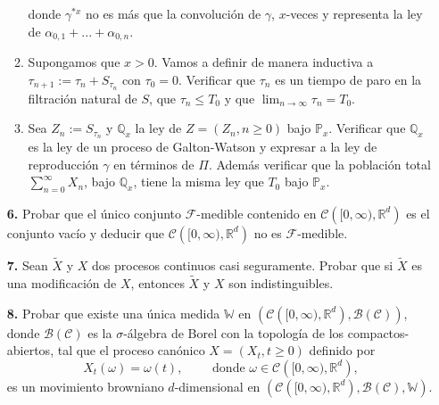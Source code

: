 \documentclass[letterpaper]{article}
\newcommand{\Q}{\mathbb{Q}}
\newcommand{\R}{\mathbb{R}}
\newcommand{\F}{\mathcal{F}}
\newcommand{\B}{\mathcal{B}}
\renewcommand{\to}{\rightarrow}
\renewcommand{\P}{\mathbb{P}}
\newcommand{\1}{\mathds{1}}
\theoremstyle{definition}
\theoremstyle{definition}
\theoremstyle{definition}
\theoremstyle{definition}
\theoremstyle{definition}
\begin{document}
\begin{itemize}
\begin{enumerate}
\[        \]
        donde $\gamma^{*x}$ no es más que la convolución de $\gamma$, $x$-veces y representa la ley 
        de $\alpha_{0,1}+...+\alpha_{0,n}$.
        \item Supongamos que $x>0$. Vamos a definir de manera inductiva a $\tau_{n+1}:=\tau_{n}+S_{\tau_n}$ con 
        $\tau_0=0$. Verificar que $\tau_n$ es un tiempo de paro en la filtración natural de $S$, que $\tau_n\leq T_0$ y 
        que $\lim_{n\to \infty}\tau_n=T_0$.
        \item Sea $Z_n:=S_{\tau_n}$ y $\Q_x$ la ley de $Z=(Z_n,n\geq0)$ bajo $\P_x$. Verificar 
        que $\Q_x$ es la ley de un proceso de Galton-Watson y expresar a la ley de reproducción $\gamma$ en términos de $\Pi$. Además 
        verificar que la población total $\sum_{n=0}^{\infty}X_n$, bajo $\Q_x$, tiene la misma 
        ley que $T_0$ bajo $\P_x$.
    \end{enumerate}
    \item[\textbf{6.}] Probar que el único conjunto $\F$-medible contenido en $\mathcal{C}\left([0,\infty),\R^{d}\right)$ es el conjunto 
    vacío y deducir que $\mathcal{C}\left([0,\infty),\R^d\right)$ no es $\F$-medible.
    \item[\textbf{7.}] Sean $\widetilde{X}$ y $X$ dos procesos continuos casi seguramente. Probar que si 
    $\widetilde{X}$ es una modificación de $X$, entonces $\widetilde{X}$ y $X$ son indistinguibles.
    \item[\textbf{8.}] Probar que existe una única medida $\mathbb{W}$ en $\left(\mathcal{C}\left([0,\infty),\R^d\right),\B(\mathcal{C})\right)$,
    donde $\B(\mathcal{C})$ es la $\sigma$-álgebra de Borel con la topología de los compactos-abiertos, tal que el proceso canónico $X=(X_t,t\geq0)$ 
    definido por 
    \[
    X_t(\omega)=\omega(t), \qquad \text{ donde }\omega\in \mathcal{C}\left([0,\infty),\R^d\right),    
    \]
    es un movimiento browniano $d$-dimensional en $\left(\mathcal{C}\left([0,\infty),\R^d\right),\B(\mathcal{C}),\mathbb{W}\right)$.

\end{itemize}
\end{document}
